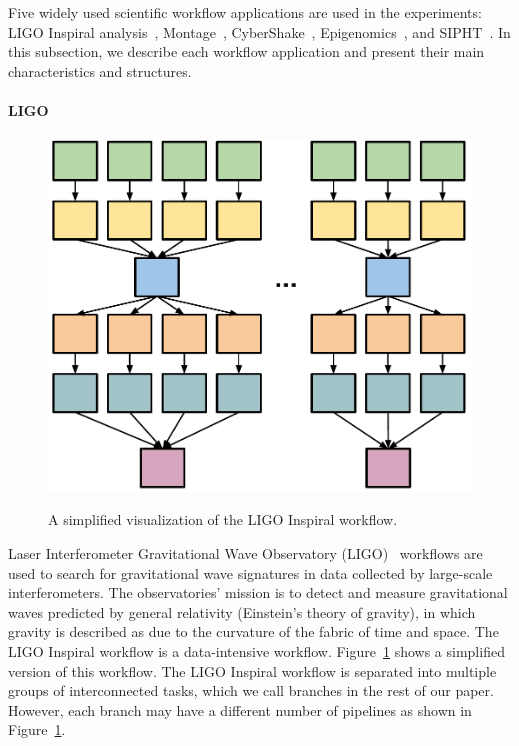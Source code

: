 \documentclass{IOS-Book-Article}
\begin{document}
Five widely used scientific workflow applications are used in the experiments: LIGO Inspiral analysis~\cite{LIGO}, Montage~\cite{Berriman2004}, CyberShake~\cite{Graves2010}, Epigenomics~\cite{Epigenome}, and SIPHT~\cite{SIPHT}. In this subsection, we describe each workflow application and present their main characteristics and structures.

\paragraph{\textbf{LIGO}}
\begin{figure}[!htb]
	\centering
	\includegraphics[width=0.5\linewidth]{ligo_shape.pdf} \\
	\caption{A simplified visualization of the LIGO Inspiral workflow.}
	\label{fig:evaluation_shape_ligo}
\end{figure}
Laser Interferometer Gravitational Wave Observatory (LIGO)~\cite{LIGO} workflows are used to search for gravitational wave signatures in data collected by large-scale interferometers. The observatories' mission is to detect and measure gravitational waves predicted by general relativity (Einstein's theory of gravity), in which gravity is described as due to the curvature of the fabric of time and space. The LIGO Inspiral workflow is a data-intensive workflow. Figure~\ref{fig:evaluation_shape_ligo} shows a simplified version of this workflow. The LIGO Inspiral workflow is separated into multiple groups of interconnected tasks, which we call branches in the rest of our paper. However, each branch may have a different number of pipelines as shown in Figure~\ref{fig:evaluation_shape_ligo}. 
\end{document}
